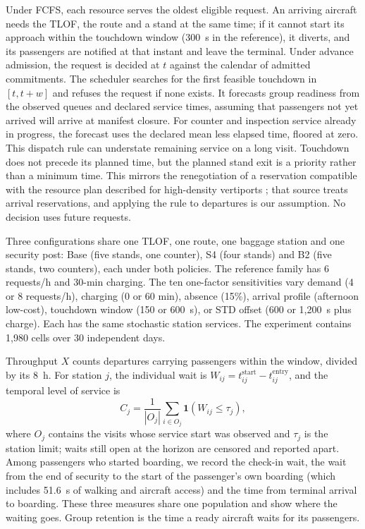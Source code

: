 \documentclass[12pt,a4paper]{article}
\makeatletter
\renewcommand\subsection{\@startsection{subsection}{2}{\z@}{8pt}{2pt}{\normalsize\bfseries}}
\makeatother
\begin{document}
Under FCFS, each resource serves the oldest eligible request. An arriving aircraft needs the TLOF,
the route and a stand at the same time; if it cannot start its approach within the touchdown window (300~s in the reference),
it diverts, and its passengers are notified at that instant and leave the terminal. Under advance
admission, the request is decided at $t$ against the calendar of admitted commitments. The scheduler
searches for the first feasible touchdown in $[t, t+w]$ and refuses the request if none
exists. It forecasts group readiness from the observed queues and declared service times, assuming
that passengers not yet arrived will arrive at manifest closure. For counter and inspection service already in progress, the forecast uses the declared mean less elapsed time, floored at zero. This dispatch rule can understate remaining service on a long visit. Touchdown does not precede its
planned time, but the planned stand exit is a priority rather than a minimum time. This mirrors the
renegotiation of a reservation compatible with the resource plan described for high-density
vertiports \cite{kunchulia2021}; that source treats arrival reservations, and applying the rule to
departures is our assumption. No decision uses future requests.

\subsection{Configurations, families and indicators}
\label{sec:design}

Three configurations share one TLOF, one route, one baggage station and one security post: Base
(five stands, one counter), S4 (four stands) and B2 (five stands, two counters), each under both
policies. The reference family has 6 requests/h and 30-min charging. The ten one-factor sensitivities vary demand (4 or 8 requests/h), charging (0 or 60 min), absence (15\%), arrival profile (afternoon low-cost), touchdown window (150 or 600~s), or STD offset (600 or 1,200~s plus charge). Each has the same stochastic station services. The experiment contains 1,980 cells over 30 independent days.

Throughput $X$ counts departures carrying passengers within the window, divided by its 8~h. For
station $j$, the individual wait is $W_{ij}=t^{\mathrm{start}}_{ij}-t^{\mathrm{entry}}_{ij}$, and the
temporal level of service is
\begin{equation}
 C_j=\frac{1}{|O_j|}\sum_{i\in O_j}\mathbf{1}\!\left(W_{ij}\leq \tau_j\right),
\end{equation}
where $O_j$ contains the visits whose service start was observed and $\tau_j$ is the station limit;
waits still open at the horizon are censored and reported apart. Among passengers who started
boarding, we record the check-in wait, the wait from the end of security to the start of the
passenger's own boarding (which includes 51.6~s of walking and aircraft access) and the time from
terminal arrival to boarding. These three measures share one population and show where the waiting
goes. Group retention is the time a ready aircraft waits for its passengers.
\end{document}
